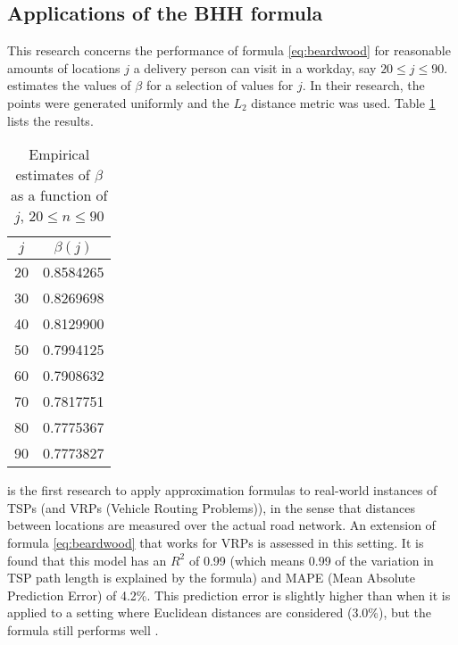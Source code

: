 \subsection{Applications of the BHH formula}
This research concerns the performance of formula \ref{eq:beardwood} for reasonable amounts of
locations $j$ a delivery person can visit in a workday, say $20\leq j\leq90$.
\citet{lei2015dynamic} estimates the values of $\beta$ for a selection of values for $j$.
In their research, the points were generated uniformly and the $L_2$ distance metric was used.
Table \ref{tab:beta-values} lists the results.
\begin{table}[H]
	\centering
	\caption{Empirical estimates of $\beta$ as a function of $j$, $20 \leq n \leq 90$ \citep{lei2015dynamic}}
	\label{tab:beta-values}
	\begin{tabular}{cc}
		\toprule
		$j$ & $\beta(j)$ \\
		\midrule
		20  & 0.8584265  \\
		30  & 0.8269698  \\
		40  & 0.8129900  \\
		50  & 0.7994125  \\
		60  & 0.7908632  \\
		70  & 0.7817751  \\
		80  & 0.7775367  \\
		90  & 0.7773827  \\
		\bottomrule
	\end{tabular}
\end{table}
\citet{figliozzi2008planning} is the first research to apply approximation formulas to real-world instances of TSPs (and VRPs (Vehicle Routing Problems)),
in the sense that distances between locations are measured over the actual road network.
An extension of formula \ref{eq:beardwood} that works for VRPs is assessed in this setting.
It is found that this model has an $R^2$ of 0.99 (which means 0.99 of the variation in TSP path length is explained by the formula) and MAPE
(Mean Absolute Prediction Error) of 4.2\%.
This prediction error is slightly higher than when it is applied to a setting where Euclidean distances are considered (3.0\%), but the formula still performs well
\citep{figliozzi2008planning}.

